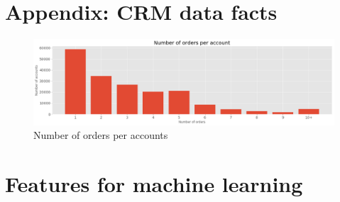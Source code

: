\appendix

\chapter{Appendix: CRM data facts}
\begin{figure}[h]
    \centering
    \includegraphics[width=15cm]{images/number_of_orders_per_account.png}
    \caption{Number of orders per accounts}
    \label{fig-annex:orders_per_accounts}
\end{figure}


\chapter{Features for machine learning}
\label{annex:features-for-ml}

